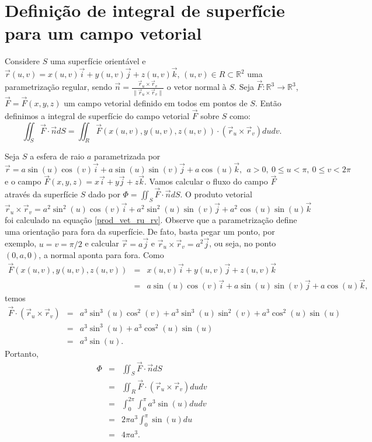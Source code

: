 \section{Definição de integral de superfície para um campo vetorial}
Considere $S$ uma superfície orientável e $\vec{r}(u,v)=x(u,v)\vec{i}+y(u,v)\vec{j}+z(u,v)\vec{k}$, $(u,v)\in R \subset \mathbb{R}^2$ uma parametrização regular, sendo $\vec{n}=\frac{\vec{r}_u\times \vec{r}_v}{\|\vec{r}_u\times \vec{r}_v\|}$ o vetor normal à $S$. Seja $\vec{F}:\mathbb{R}^3\to \mathbb{R}^3$, $\vec{F}=\vec{F}(x,y,z)$ um campo vetorial definido em todos em pontos de $S$. Então definimos a integral de superfície do campo vetorial $\vec{F}$ sobre $S$ como:
\begin{equation}\label{definicao_int_sup_vet}
\iint_S \vec{F}\cdot \vec{n} d S= \iint_R \vec{F}(x(u,v),y(u,v),z(u,v))\cdot (\vec{r}_u\times \vec{r}_v) dudv.
\end{equation}
\begin{ex}\label{ex_esfera_int_sup_vet}Seja $S$ a esfera de raio $a$ parametrizada por 
$$
\vec{r}=a\sin(u)\cos(v)\vec{i}+a\sin(u)\sin(v)\vec{j}+a\cos(u)\vec{k},~~ a>0, ~ 0\leq u< \pi, ~ 0\leq v< 2\pi
$$
e o campo $\vec{F}(x,y,z)=x\vec{i}+y\vec{j}+z\vec{k}$. Vamos calcular o fluxo do campo $\vec{F}$ através da superfície $S$ dado por $\Phi=\iint_S \vec{F}\cdot\vec{n} d S $. O produto vetorial
$$
\vec{r}_u\times\vec{r}_v= a^2\sin^2(u)\cos(v)\vec{i}+ a^2\sin^2(u)\sin(v)\vec{j}+a^2\cos(u)\sin(u)\vec{k}
$$
foi calculado na equação \eqref{prod_vet_ru_rv}. Observe que a parametrização define uma orientação para fora da superfície. De fato, basta pegar um ponto, por exemplo, $u=v=\pi/2$ e calcular $\vec{r}=a\vec{j}$ e $\vec{r}_u\times\vec{r}_v=a^2\vec{j}$, ou seja, no ponto $(0,a,0)$, a normal aponta para fora. Como
\begin{eqnarray*}
\vec{F}(x(u,v),y(u,v),z(u,v))&=&x(u,v)\vec{i}+y(u,v)\vec{j}+z(u,v)\vec{k}\\
&=&a\sin(u)\cos(v)\vec{i}+a\sin(u)\sin(v)\vec{j}+a\cos(u)\vec{k},
\end{eqnarray*}
temos
\begin{eqnarray*}
 \vec{F}\cdot (\vec{r}_u\times\vec{r}_v)&=& a^3\sin^3(u)\cos^2(v)+a^3\sin^3(u)\sin^2(v)+a^3\cos^2(u)\sin(u)\\
 &=& a^3\sin^3(u)+a^3\cos^2(u)\sin(u)\\
 &=& a^3\sin(u).
\end{eqnarray*}
Portanto,
\begin{eqnarray*}
 \Phi&=&\iint_S \vec{F}\cdot\vec{n} d S \\
&=& \iint_R \vec{F}\cdot (\vec{r}_u\times\vec{r}_v) d udv \\
&=& \int_0^{2\pi}\int_0^\pi a^3\sin(u) d udv \\
&=& 2\pi a^3\int_0^\pi \sin(u) d u \\
&=&4\pi a^3.
\end{eqnarray*}
\end{ex}
